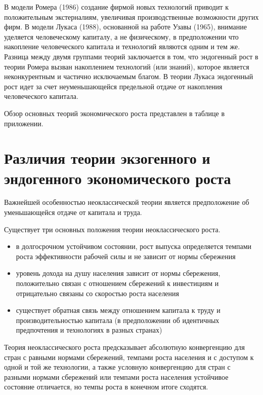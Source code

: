 \documentclass[12pt,a4paper, oneside]{extreport}
\begin{document}
В модели Ромера (1986)  создание фирмой новых технологий  приводит к  положительным экстерналиям, увеличивая  производственные возможности других фирм.
В модели Лукаса (1988), основанной на работе  Узавы (1965), внимание уделяется  человеческому капиталу, а не физическому, в  предположении что накопление человеческого капитала и технологий являются  одним и тем же.
Разница между двумя группами теорий заключается в том, что эндогенный рост в теории Ромера  вызван накоплением технологий (или знаний), которое является неконкурентным и частично исключаемым благом. В теории Лукаса эндогенный рост идет за счет неуменьшающейся предельной отдаче  от накопления  человеческого капитала. 





Обзор основных теорий экономического роста представлен в таблице в приложении.





\section{Различия теории  экзогенного и эндогенного экономического роста}


Важнейшей особенностью  неоклассической теории  является предположение об уменьшающейся  отдаче от  капитала и труда. 

Существует три основных положения теории неоклассического роста.
\begin{itemize}
	\item в долгосрочном  устойчивом состоянии, рост выпуска определяется темпами роста эффективности  рабочей силы  и не зависит от нормы сбережения 
	\item уровень дохода на душу населения зависит от нормы сбережения, положительно связан с отношением сбережений к инвестициям  и отрицательно связаны со скоростью роста населения
	\item 	 существует обратная связь между отношением капитала к труду и производительностью капитала (в предположении об  идентичных предпочтения и технологиях в разных странах)
\end{itemize}


Теория неоклассического роста предсказывает абсолютную  конвергенцию для стран  с равными нормами  сбережений, темпами  роста населения и с доступом к одной и той же технологии, а также условную конвергенцию для стран с разными нормами  сбережений или темпами  роста населения устойчивое состояние  отличается, но темпы роста в конечном итоге сходятся.
\end{document}
